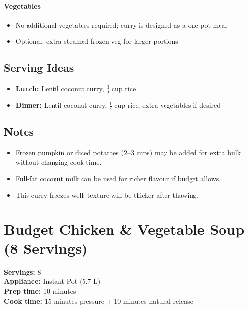 \documentclass[11pt,a4paper]{article}
\begin{document}
\paragraph{Vegetables}
\begin{itemize}
    \item No additional vegetables required; curry is designed as a one-pot meal
    \item Optional: extra steamed frozen veg for larger portions
\end{itemize}

\vspace{0.5em}

\subsection*{Serving Ideas}
\begin{itemize}
    \item \textbf{Lunch:} Lentil coconut curry, $\tfrac{3}{4}$ cup rice
    \item \textbf{Dinner:} Lentil coconut curry, $\tfrac{1}{2}$ cup rice, extra vegetables if desired
\end{itemize}

\vspace{0.5em}

\subsection*{Notes}
\begin{itemize}
    \item Frozen pumpkin or diced potatoes (2--3 cups) may be added for extra bulk without changing cook time.
    \item Full-fat coconut milk can be used for richer flavour if budget allows.
    \item This curry freezes well; texture will be thicker after thawing.
\end{itemize}

\section*{Budget Chicken \& Vegetable Soup (8 Servings)}

\textbf{Servings:} 8 \\
\textbf{Appliance:} Instant Pot (5.7 L) \\
\textbf{Prep time:} 10 minutes \\
\textbf{Cook time:} 15 minutes pressure + 10 minutes natural release
\end{document}
